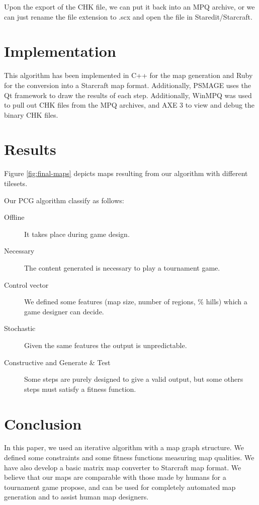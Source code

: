 \documentclass[letterpaper]{article}
\begin{document}
Upon the export of the CHK file, we can put it back into an MPQ archive, or we can just rename the file extension to .scx and open the file in Staredit/Starcraft.



\section{Implementation} %
\label{sec:implementation}
This algorithm has been implemented in C++ for the map generation and Ruby for the conversion into a Starcraft map format. Additionally, PSMAGE uses the Qt framework to draw the results of each step. Additionally, WinMPQ was used to pull out CHK files from the MPQ archives, and AXE 3 to view and debug the binary CHK files.


\section{Results} %
\label{sec:results}
Figure \ref{fig:final-maps} depicts maps resulting from our algorithm with different tilesets.

Our PCG algorithm classify as follows:
\begin{description}
	\item[Offline] It takes place during game design.
	\item[Necessary] The content generated is necessary to play a tournament game.
	\item[Control vector] We defined some features (map size, number of regions, \% hills) which a game designer can decide.
	\item[Stochastic] Given the same features the output is unpredictable.
	\item[Constructive and Generate \& Test] Some steps are purely designed to give a valid output, but some others steps must satisfy a fitness function.
\end{description}



\section{Conclusion} %
\label{sec:conclusion}
In this paper, we used an iterative algorithm with a map graph structure. We defined some constraints and some ﬁtness functions measuring map qualities. We have also develop a basic matrix map converter to Starcraft map format. We believe that our maps are comparable with those made by humans for a tournament game propose, and can be used for completely automated map generation and to assist human map designers.
\end{document}
